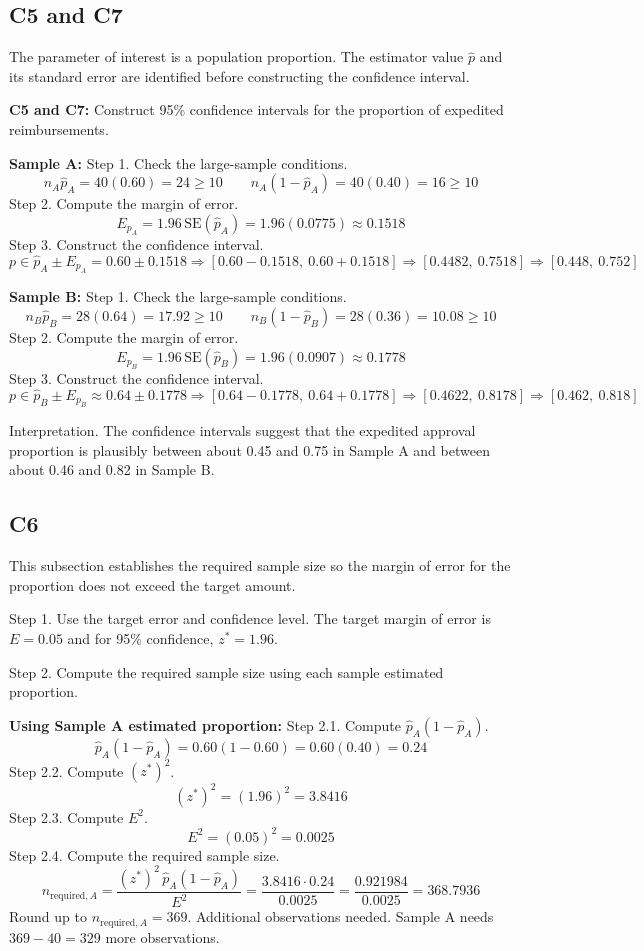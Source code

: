 \begin{ExamProblems}
		\subsection*{C5 and C7}
		The parameter of interest is a population proportion.
		The estimator value $\hat{p}$ and its standard error are identified before constructing the confidence interval.
		
		\textbf{C5 and C7:} Construct 95\% confidence intervals for the proportion of expedited reimbursements.
		
		\textbf{Sample A:}
		Step 1.
		Check the large-sample conditions.
		\[
		n_A\hat{p}_A = 40(0.60) = 24 \ge 10
		\qquad
		n_A(1-\hat{p}_A) = 40(0.40) = 16 \ge 10
		\]
		Step 2.
		Compute the margin of error.
		\[
		E_{p_A} = 1.96\,\mathrm{SE}(\hat{p}_A)
		= 1.96(0.0775)
		\approx 0.1518
		\]
		Step 3.
		Construct the confidence interval.
		\[
		p \in \hat{p}_A \pm E_{p_A}
		= 0.60 \pm 0.1518
		\Rightarrow [0.60-0.1518,\ 0.60+0.1518]
		\Rightarrow [0.4482,\ 0.7518]
		\Rightarrow [0.448,\ 0.752]
		\]
		
		\textbf{Sample B:}
		Step 1.
		Check the large-sample conditions.
		\[
		n_B\hat{p}_B = 28(0.64) = 17.92 \ge 10
		\qquad
		n_B(1-\hat{p}_B) = 28(0.36) = 10.08 \ge 10
		\]
		Step 2.
		Compute the margin of error.
		\[
		E_{p_B} = 1.96\,\mathrm{SE}(\hat{p}_B)
		= 1.96(0.0907)
		\approx 0.1778
		\]
		Step 3.
		Construct the confidence interval.
		\[
		p \in \hat{p}_B \pm E_{p_B}
		\approx 0.64 \pm 0.1778
		\Rightarrow [0.64-0.1778,\ 0.64+0.1778]
		\Rightarrow [0.4622,\ 0.8178]
		\Rightarrow [0.462,\ 0.818]
		\]
		
		Interpretation.
		The confidence intervals suggest that the expedited approval proportion is plausibly between about 0.45 and 0.75 in Sample A and between about 0.46 and 0.82 in Sample B.
		
		\subsection*{C6}
		This subsection establishes the required sample size so the margin of error for the proportion does not exceed the target amount.
		
		Step 1.
		Use the target error and confidence level.
		The target margin of error is $E = 0.05$ and for 95\% confidence, $z^* = 1.96$.
		
		Step 2.
		Compute the required sample size using each sample estimated proportion.
		
		\textbf{Using Sample A estimated proportion:}
		Step 2.1.
		Compute $\hat{p}_A(1-\hat{p}_A)$.
		\[
		\hat{p}_A(1-\hat{p}_A) = 0.60(1-0.60) = 0.60(0.40) = 0.24
		\]
		Step 2.2.
		Compute $(z^*)^2$.
		\[
		(z^*)^2 = (1.96)^2 = 3.8416
		\]
		Step 2.3.
		Compute $E^2$.
		\[
		E^2 = (0.05)^2 = 0.0025
		\]
		Step 2.4.
		Compute the required sample size.
		\[
		n_{\text{required},A} = \frac{(z^*)^2\,\hat{p}_A(1-\hat{p}_A)}{E^2}
		= \frac{3.8416 \cdot 0.24}{0.0025}
		= \frac{0.921984}{0.0025}
		= 368.7936
		\]
		Round up to $n_{\text{required},A} = 369$.
		Additional observations needed.
		Sample A needs $369 - 40 = 329$ more observations.
		

\end{ExamProblems}
